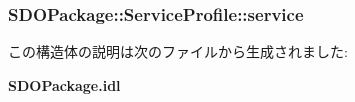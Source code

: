 \subsubsection[{service}]{ {\bf SDOPackage::ServiceProfile::service}}\label{structSDOPackage_1_1ServiceProfile_a603c6ea80a4a86c0dc1dad9f20d96efb}


この構造体の説明は次のファイルから生成されました:\begin{DoxyCompactItemize}
\item 
{\bf SDOPackage.idl}\end{DoxyCompactItemize}

